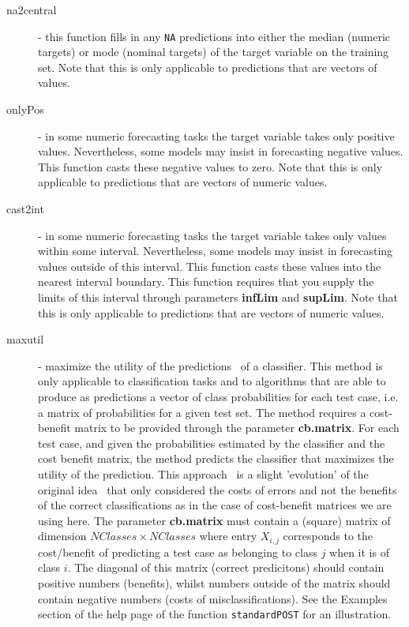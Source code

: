 \documentclass[10pt,a4paper]{article}\usepackage[]{graphicx}\usepackage[]{color}
\begin{document}
\begin{description}
\item[na2central] - this function fills in any \texttt{NA} predictions into
  either the median (numeric targets) or mode (nominal targets) of the
  target variable on the training set. Note that this is only applicable
  to predictions that are vectors of values.

\item[onlyPos] - in some numeric forecasting tasks the target variable
  takes only positive values. Nevertheless, some models may insist in
  forecasting negative values. This function casts these negative values
  to zero. Note that this is only applicable
  to predictions that are vectors of numeric values.

\item[cast2int] - in some numeric forecasting tasks the target variable
  takes only values within some interval. Nevertheless, some models may
  insist in forecasting  values outside of this interval. This function
  casts these values  into the nearest interval boundary. This function
  requires that you supply the limits of this interval through
  parameters \textbf{infLim} and \textbf{supLim}. Note that this is only
  applicable to predictions that are vectors of numeric values.

\item[maxutil] - maximize the utility of the predictions~\cite{Elk01}  of a
  classifier. This method is only applicable to classification tasks and
  to algorithms that are able to produce as predictions a vector of
  class probabilities for each test case, i.e. a matrix of probabilities
  for a given test set. The method requires a cost-benefit matrix to be
  provided through the parameter \textbf{cb.matrix}. For each test case,
  and given the probabilities estimated by the classifier and the cost
  benefit matrix, the method predicts the classifier that maximizes the
  utility of the prediction. This approach~\cite{Elk01} is a slight 'evolution' of
  the original idea~\cite{BFOS84} that only considered the costs of errors and not the
  benefits of the correct classifications as in the case of cost-benefit
  matrices we are using here. The parameter \textbf{cb.matrix} must
  contain a (square) matrix of dimension $NClasses\times NClasses$ where entry
  $X_{i,j}$ corresponds to the cost/benefit of predicting a test case as
  belonging to class $j$ when it is of class $i$. The diagonal of this
  matrix (correct predicitons) should contain positive numbers
  (benefits), whilst numbers outside of the matrix should contain
  negative numbers (costs of misclassifications). See the Examples
  section of the help page of the function \texttt{standardPOST} for an illustration. 
\end{description}
\end{document}
